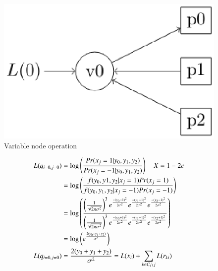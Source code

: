 \documentclass[journal,12pt,twocolumn]{IEEEtran}
\begin{document}
\begin{enumerate}
\begin{figure}[!ht]
\begin{center}
%
%
%
%
\includegraphics[width=\columnwidth]{./figs/varope}
\end{center}
\caption{Variable node operation}
\label{fig : var}
\end{figure}
\begin{align}
L(q_{i=0,j=0})&=\log \left(\frac{Pr(x_j=1|y_0,y_1,y_2)}{Pr(x_j=-1|y_0,y_1,y_2)}\right) \quad X=1-2c\\
&= \log \left(\frac{f(y_0,y1,y_2|x_j=1)Pr(x_j=1)}{f(y_0,y_1,y_2|x_j=-1)Pr(x_j=-1)}\right) \\
&= \log \left(\frac{\left(\frac{1}{\sqrt{2\pi\sigma^2}}\right)^3e^{\frac{-(y_0-1)^2}{2\sigma^2}}e^{\frac{-(y_1-1)^2}{2\sigma^2}}e^{\frac{-(y_2-1)^2}{2\sigma^2}}}{\left(\frac{1}{\sqrt{2\pi\sigma^2}}\right)^3e ^{\frac{-(y_0+1)^2}{2\sigma^2}}e ^{\frac{-(y_1+1)^2}{2\sigma^2}}e ^{\frac{-(y_2+1)^2}{2\sigma^2}} }  \right) \\
&=\log \left(e^{\frac{2(y_0+y_1+y_2)}{\sigma^2}}\right) \\
L(q_{i=0,j=0})&= \frac{2(y_0+y_1+y_2)}{\sigma^2}=L(x_i)+\sum_{k \in C_i\setminus j} L(r_{ki}) \label{eq: qij}
\end{align}
\end{enumerate}
\end{document}
